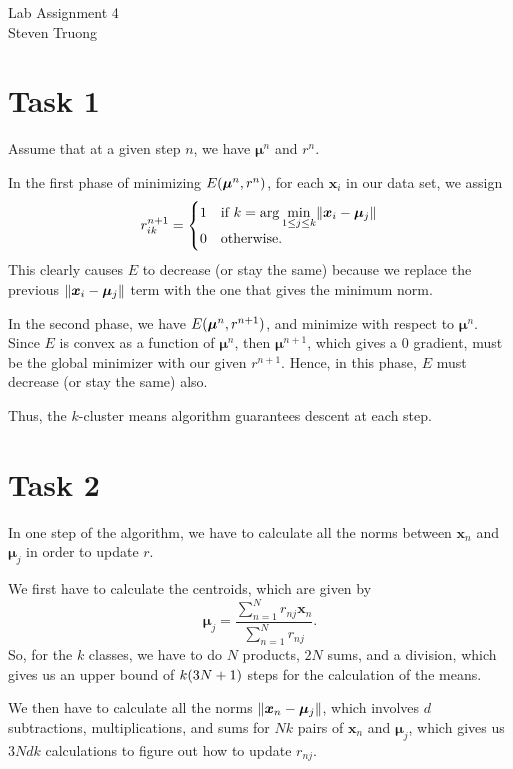\documentclass{article}
\renewcommand{\vec}[1]{\boldsymbol{#1}}
\DeclarePairedDelimiter{\p}{(}{)}
\DeclarePairedDelimiter{\norm}{\Vert}{\Vert}
\begin{document}
{\huge Lab Assignment 4} \\	
\large Steven Truong \\

\normalsize

\section*{Task 1}
Assume that at a given step $n$, we have $\vec{\mu}^n$ and $r^n$.

In the first phase of minimizing $E\p{\vec{\mu}^n, r^n}$, for each $\vec{x}_i$ in our data set, we assign
\[
	r^{n+1}_{ik} =
		\begin{cases}
			1 & \displaystyle\text{if } k = \arg\min_{1\leq j\leq k}\norm{\vec{x}_i - \vec{\mu}_j} \\
			0 & \text{otherwise}.
		\end{cases}
\]
This clearly causes $E$ to decrease (or stay the same) because we replace the previous $\norm{\vec{x}_i - \vec{\mu}_j}$ term with the one that gives the minimum norm.

In the second phase, we have $E\p{\vec{\mu}^n, r^{n+1}}$, and minimize with respect to $\vec{\mu}^n$. Since $E$ is convex as a function of $\vec{\mu}^n$, then $\vec{\mu}^{n+1}$, which gives a $0$ gradient, must be the global minimizer with our given $r^{n+1}$. Hence, in this phase, $E$ must decrease (or stay the same) also.

Thus, the $k$-cluster means algorithm guarantees descent at each step.

\section*{Task 2}
In one step of the algorithm, we have to calculate all the norms between $\vec{x}_n$ and $\vec{\mu}_j$ in order to update $r$.

We first have to calculate the centroids, which are given by
\[
	\vec{\mu}_j = \frac{\displaystyle\sum_{n=1}^N r_{nj}\vec{x}_n}{\displaystyle\sum_{n=1}^N r_{nj}}.
\]
So, for the $k$ classes, we have to do $N$ products, $2N$ sums, and a division, which gives us an upper bound of $k\p{3N + 1}$ steps for the calculation of the means.

We then have to calculate all the norms $\norm{\vec{x}_n - \vec{\mu}_j}$, which involves $d$ subtractions, multiplications, and sums for $Nk$ pairs of $\vec{x}_n$ and $\vec{\mu}_j$, which gives us $3Ndk$ calculations to figure out how to update $r_{nj}$.
\end{document}
